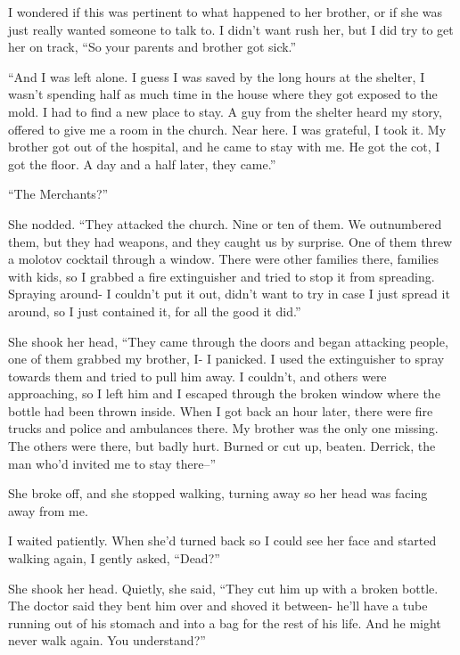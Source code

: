 I wondered if this was pertinent to what happened to her brother, or if she was just really wanted someone to talk to.  I didn't want rush her, but I did try to get her on track,  ``So your parents and brother got sick.''



``And I was left alone.  I guess I was saved by the long hours at the shelter, I wasn't spending half as much time in the house where they got exposed to the mold.  I had to find a new place to stay.  A guy from the shelter heard my story, offered to give me a room in the church.  Near here.  I was grateful, I took it.  My brother got out of the hospital, and he came to stay with me.  He got the cot, I got the floor.  A day and a half later, they came.''



``The Merchants?''



She nodded.  ``They attacked the church.  Nine or ten of them.  We outnumbered them, but they had weapons, and they caught us by surprise.  One of them threw a molotov cocktail through a window.  There were other families there, families with kids, so I grabbed a fire extinguisher and tried to stop it from spreading.  Spraying around- I couldn't put it out, didn't want to try in case I just spread it around, so I just contained it, for all the good it did.''



She shook her head, ``They came through the doors and began attacking people, one of them grabbed my brother, I- I panicked.  I used the extinguisher to spray towards them and tried to pull him away.  I couldn't, and others were approaching, so I left him and I escaped through the broken window where the bottle had been thrown inside.  When I got back an hour later, there were fire trucks and police and ambulances there.  My brother was the only one missing.  The others were there, but badly hurt.  Burned or cut up, beaten.  Derrick, the man who'd invited me to stay there--''



She broke off, and she stopped walking, turning away so her head was facing away from me.



I waited patiently.  When she'd turned back so I could see her face and started walking again, I gently asked, ``Dead?''



She shook her head.  Quietly, she said, ``They cut him up with a broken bottle.  The doctor said they bent him over and shoved it between- he'll have a tube running out of his stomach and into a bag for the rest of his life.  And he might never walk again.  You understand?''



